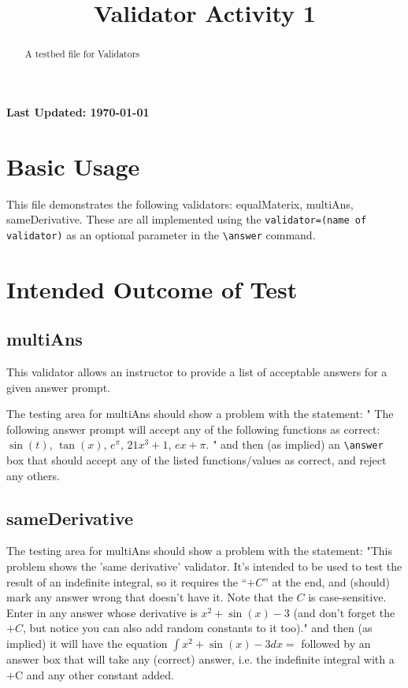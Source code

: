 \documentclass{ximera}
\title{Validator Activity 1}
\begin{document}
\begin{abstract}
    A testbed file for Validators
\end{abstract}
\maketitle

{{\Huge \bfseries Last Updated: \today}} \\

\section{Basic Usage}

This file demonstrates the following validators: equalMaterix, multiAns, sameDerivative.
These are all implemented using the \verb|validator=(name of validator)| as an optional parameter in the \verb|\answer| command.

\section{Intended Outcome of Test}

    \subsection*{multiAns}
        This validator allows an instructor to provide a list of acceptable answers for a given answer prompt.

        The testing area for multiAns should show a problem with the statement: 
        " The following answer prompt will accept any of the following functions as correct: $\sin(t)$, $\tan(x)$, $e^\pi$, $21x^3 + 1$, $ex + \pi$. "
        and then (as implied) an \verb|\answer| box that should accept any of the listed functions/values as correct, and reject any others.

    \subsection*{sameDerivative}
        The testing area for multiAns should show a problem with the statement: 
        "This problem shows the 'same derivative' validator. It's intended to be used to test the result of an indefinite integral, so it requires the ``$+C$'' at the end, and (should) mark any answer wrong that doesn't have it. Note that the $C$ is case-sensitive. \\
            
            Enter in any answer whose derivative is $x^2 + \sin(x) - 3$ (and don't forget the $+C$, but notice you can also add random constants to it too)."
        and then (as implied) it will have the equation $\int x^2 + \sin(x) - 3 dx =$ followed by an answer box that will take any (correct) answer, i.e. the 
        indefinite integral with a +C and any other constant added.
\end{document}

